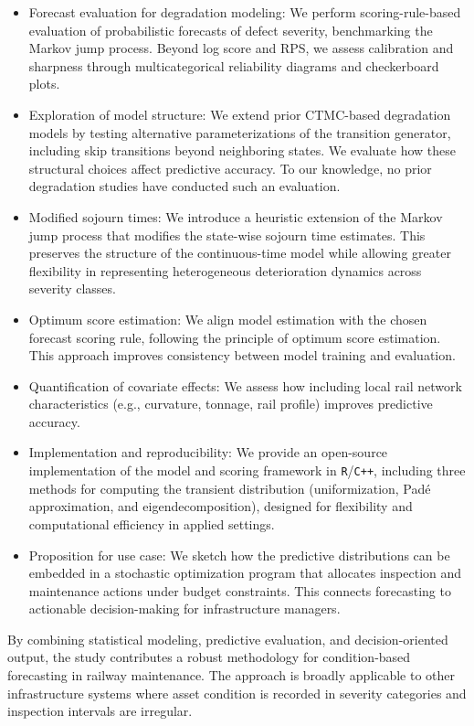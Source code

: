\begin{itemize}
    \item Forecast evaluation for degradation modeling: We perform scoring-rule-based evaluation of probabilistic forecasts of defect severity, benchmarking the Markov jump process. Beyond log score and RPS, we assess calibration and sharpness through multicategorical reliability diagrams and checkerboard plots.
    \item Exploration of model structure: We extend prior CTMC-based degradation models by testing alternative parameterizations of the transition generator, including skip transitions beyond neighboring states. We evaluate how these structural choices affect predictive accuracy. To our knowledge, no prior degradation studies have conducted such an evaluation.
    \item Modified sojourn times: We introduce a heuristic extension of the Markov jump process that modifies the state-wise sojourn time estimates. This preserves the structure of the continuous-time model while allowing greater flexibility in representing heterogeneous deterioration dynamics across severity classes.
    \item Optimum score estimation: We align model estimation with the chosen forecast scoring rule, following the principle of optimum score estimation. This approach improves consistency between model training and evaluation.
    \item Quantification of covariate effects: We assess how including local rail network characteristics (e.g., curvature, tonnage, rail profile) improves predictive accuracy.
    \item Implementation and reproducibility: We provide an open-source implementation of the model and scoring framework in \texttt{R}/\texttt{C++}, including three methods for computing the transient distribution (uniformization, Padé approximation, and eigendecomposition), designed for flexibility and computational efficiency in applied settings.
    \item Proposition for use case: We sketch how the predictive distributions can be embedded in a stochastic optimization program that allocates inspection and maintenance actions under budget constraints. This connects forecasting to actionable decision-making for infrastructure managers.
\end{itemize}

By combining statistical modeling, predictive evaluation, and decision-oriented output, the study contributes a robust methodology for condition-based forecasting in railway maintenance. The approach is broadly applicable to other infrastructure systems where asset condition is recorded in severity categories and inspection intervals are irregular.



